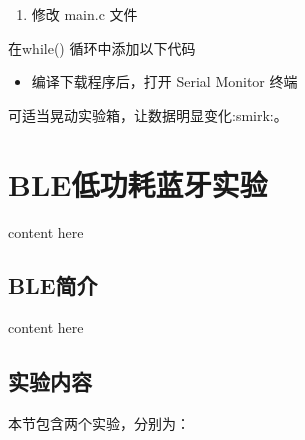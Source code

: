 \documentclass[a4paper,12pt,english]{sphinxmanual}
\begin{document}
\sphinxAtStartPar
{}
\begin{enumerate}
%
\setcounter{enumi}{5}
\item {} 
\sphinxAtStartPar
修改 main.c 文件

\end{enumerate}

\sphinxAtStartPar
在while() 循环中添加以下代码

\begin{sphinxVerbatim}[commandchars=\\\{\}]
\end{sphinxVerbatim}
\begin{itemize}
\item {} 
\sphinxAtStartPar
编译下载程序后，打开 Serial Monitor 终端

\end{itemize}

\sphinxAtStartPar
{}

\sphinxAtStartPar
可适当晃动实验箱，让数据明显变化:smirk:。

\sphinxstepscope


\section{BLE低功耗蓝牙实验}
\label{\detokenize{exp-stm32/ble/index:ble}}\label{\detokenize{exp-stm32/ble/index::doc}}
\sphinxAtStartPar
content here


\subsection{BLE简介}
\label{\detokenize{exp-stm32/ble/index:id1}}
\sphinxAtStartPar
content here


\subsection{实验内容}
\label{\detokenize{exp-stm32/ble/index:id2}}
\sphinxAtStartPar
本节包含两个实验，分别为：
\end{document}
